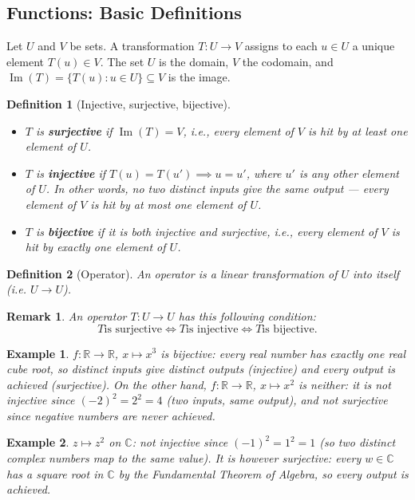 \documentclass{article}
\newtheorem{definition}{Definition}
\newtheorem*{example}{Example}
\newtheorem{remark}{Remark}
\begin{document}
\subsection{Functions: Basic Definitions}

Let $U$ and $V$ be sets. A transformation $T: U \to V$ assigns to each $u \in U$ a unique element $T(u) \in V$. The set $U$ is the domain, $V$ the codomain, and $\operatorname{Im}(T) = \{T(u) : u \in U\} \subseteq V$ is the image.

\begin{definition}[Injective, surjective, bijective]
    \hfill
    \begin{itemize}
        \item $T$ is \textbf{surjective} if $\operatorname{Im}(T) = V$, i.e., every element of $V$ is hit by at least one element of $U$.
        \item $T$ is \textbf{injective} if $T(u) = T(u') \implies u = u'$, where $u'$ is any other element of $U$. In other words, no two distinct inputs give the same output --- every element of $V$ is hit by \emph{at most} one element of $U$.
        \item $T$ is \textbf{bijective} if it is both injective and surjective, i.e., every element of $V$ is hit by \emph{exactly} one element of $U$.
    \end{itemize}
\end{definition}
\begin{definition}[Operator]
    An operator is a linear transformation of $U$ into itself (i.e. $U \to U$).
\end{definition}
\begin{remark}
    An operator $T: U\to U$ has this following condition:
    \[T \text{is surjective} \iff T \text{is injective} \iff T \text{is bijective}.\]
\end{remark}
\begin{example}
    $f: \mathbb{R}\to\mathbb{R}$, $x\mapsto x^3$ is bijective: every real number has exactly one real cube root, so distinct inputs give distinct outputs (injective) and every output is achieved (surjective). On the other hand, $f: \mathbb{R}\to\mathbb{R}$, $x\mapsto x^2$ is neither: it is not injective since $(-2)^2 = 2^2 = 4$ (two inputs, same output), and not surjective since negative numbers are never achieved.
\end{example}
\begin{example}
    $z\mapsto z^2$ on $\mathbb{C}$: not injective since $(-1)^2 = 1^2 = 1$ (so two distinct complex numbers map to the same value). It is however surjective: every $w\in\mathbb{C}$ has a square root in $\mathbb{C}$ by the Fundamental Theorem of Algebra, so every output is achieved.
\end{example}
\end{document}
